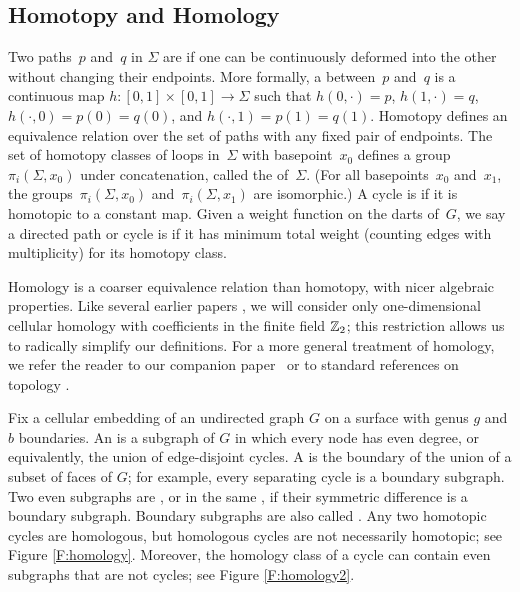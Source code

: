 \subsection{Homotopy and Homology}

Two paths~$p$ and~$q$ in $\Sigma$ are  if one can be
continuously deformed into the other without changing their endpoints.
More formally, a  between~$p$ and~$q$ is a
continuous map $h\colon {[0,1]\times [0,1] \to \Sigma}$ such that $h(0,\cdot) = p$, $h(1,\cdot) = q$, $h(\cdot, 0)=p(0)=q(0)$, and $h(\cdot,1)=p(1)=q(1)$.
Homotopy defines an equivalence relation over the set of paths with any
fixed pair of endpoints. The set of homotopy classes of loops in~$\Sigma$
with basepoint~$x_0$ defines a group~$\pi_i(\Sigma,x_0)$ under concatenation,
called the  of~$\Sigma$. (For all basepoints~$x_0$
and~$x_1$, the groups~$\pi_i(\Sigma,x_0)$ and~$\pi_i(\Sigma,x_1)$ are
isomorphic.) A cycle is  if it is homotopic to a constant
map.
Given a weight function on the darts of~$G$, we say a directed path or cycle is  if it has minimum total weight (counting edges with multiplicity) for its homotopy class.

Homology is a coarser equivalence relation than homotopy, with nicer
algebraic properties.  Like several earlier papers \cite{cf-qhc2-07,
cf-qhc-08, dls-chtl-07, dlsc-cgaht-08}, we will consider only
one-dimensional cellular homology with coefficients in the finite
field $\mathbb{Z}_2$; this restriction allows us to radically simplify our
definitions.  For a more general treatment of homology, we refer the
reader to our companion paper~\cite{cen-hfcc-09} or to standard
references on topology \cite{h-at-01, s-ctcgt-93, z-tc-05}.


Fix a cellular embedding of an undirected graph $G$ on a surface with genus $g$ and $b$ boundaries.  An  is a subgraph of $G$ in which every node has even degree, or equivalently, the union of edge-disjoint cycles.  A  is the boundary of the union of a subset of faces of $G$; for example, every separating cycle is a boundary subgraph.
Two even subgraphs are , or in the same , if their symmetric difference is a boundary subgraph.
Boundary subgraphs are also called .  Any two homotopic cycles are homologous, but homologous cycles are not necessarily homotopic; see Figure \ref{F:homology}.  Moreover, the homology class of a cycle can contain even subgraphs that are not cycles; see Figure \ref{F:homology2}.

